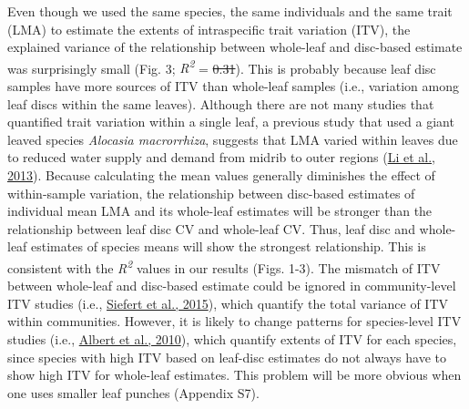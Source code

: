 \documentclass[
  12pt,
  a4paper,
,tablecaptionabove
]{scrartcl}
\providecommand{\DIFaddtex}[1]{{\protect\color{blue}\uwave{#1}}} %
\providecommand{\DIFdeltex}[1]{{\protect\color{red}\sout{#1}}}                      %
\providecommand{\DIFaddbegin}{} %
\providecommand{\DIFaddend}{} %
\providecommand{\DIFdelbegin}{} %
\providecommand{\DIFdelend}{} %
\providecommand{\DIFadd}[1]{\texorpdfstring{\DIFaddtex{#1}}{#1}} %
\providecommand{\DIFdel}[1]{\texorpdfstring{\DIFdeltex{#1}}{}} %
\newcommand{\DIFscaledelfig}{0.5}
\newlength{\DIFdelgraphicswidth} %
\newlength{\DIFdelgraphicsheight} %
\newcommand{\DIFaddincludegraphics}[2][]{{\color{blue}\fbox{\DIFOincludegraphics[#1]{#2}}}} %
\newcommand{\DIFdelincludegraphics}[2][]{%
\sbox{\DIFdelgraphicsbox}{\DIFOincludegraphics[#1]{#2}}%
\settoboxwidth{\DIFdelgraphicswidth}{\DIFdelgraphicsbox} %
\settoboxtotalheight{\DIFdelgraphicsheight}{\DIFdelgraphicsbox} %
\scalebox{\DIFscaledelfig}{%
\parbox[b]{\DIFdelgraphicswidth}{\usebox{\DIFdelgraphicsbox}\\[-\baselineskip] \rule{\DIFdelgraphicswidth}{0em}}\llap{\resizebox{\DIFdelgraphicswidth}{\DIFdelgraphicsheight}{%
\setlength{\unitlength}{\DIFdelgraphicswidth}%
\begin{picture}(1,1)%
\thicklines\linethickness{2pt} %
{\color[rgb]{1,0,0}\put(0,0){\framebox(1,1){}}}%
{\color[rgb]{1,0,0}\put(0,0){\line( 1,1){1}}}%
{\color[rgb]{1,0,0}\put(0,1){\line(1,-1){1}}}%
\end{picture}%
}\hspace*{3pt}}} %
} %
\DeclareRobustCommand{\DIFaddbegin}{\DIFOaddbegin \let\includegraphics\DIFaddincludegraphics} %
\DeclareRobustCommand{\DIFaddend}{\DIFOaddend \let\includegraphics\DIFOincludegraphics} %
\DeclareRobustCommand{\DIFdelbegin}{\DIFOdelbegin \let\includegraphics\DIFdelincludegraphics} %
\DeclareRobustCommand{\DIFdelend}{\DIFOaddend \let\includegraphics\DIFOincludegraphics} %
\begin{document}
Even though we used the same species, the same individuals and the same
trait (LMA) to estimate the extents of intraspecific trait variation
(ITV), the explained variance of the relationship between whole-leaf and
disc-based estimate was surprisingly small (Fig. 3;
\emph{R\textsuperscript{2}} = \DIFdelbegin \DIFdel{0.31}\DIFdelend \DIFaddbegin \DIFadd{0.32}\DIFaddend ). This is probably because leaf disc
samples have more sources of ITV than whole-leaf samples (i.e.,
variation among leaf discs within the same leaves). Although there are
not many studies that quantified trait variation within a single leaf, a
previous study that used a giant leaved species \emph{Alocasia
macrorrhiza}, suggests that LMA varied within leaves due to reduced
water supply and demand from midrib to outer regions
(\protect\hyperlink{ref-Li2013a}{Li et al., 2013}). Because calculating
the mean values generally diminishes the effect of within-sample
variation, the relationship between disc-based estimates of individual
mean LMA and its whole-leaf estimates will be stronger than the
relationship between leaf disc CV and whole-leaf CV. Thus, leaf disc and
whole-leaf estimates of species means will show the strongest
relationship. This is consistent with the \emph{R\textsuperscript{2}}
values in our results (Figs. 1-3). The mismatch of ITV between
whole-leaf and disc-based estimate could be ignored in community-level
ITV studies (i.e., \protect\hyperlink{ref-Siefert2015}{Siefert et al.,
2015}), which quantify the total variance of ITV within communities.
However, it is likely to change patterns for species-level ITV studies
(i.e., \protect\hyperlink{ref-Albert2010a}{Albert et al., 2010}), which
quantify extents of ITV for each species, since species with high ITV
based on leaf-disc estimates do not always have to show high ITV for
whole-leaf estimates. This problem will be more obvious when one uses
smaller leaf punches (Appendix S7).
\end{document}
